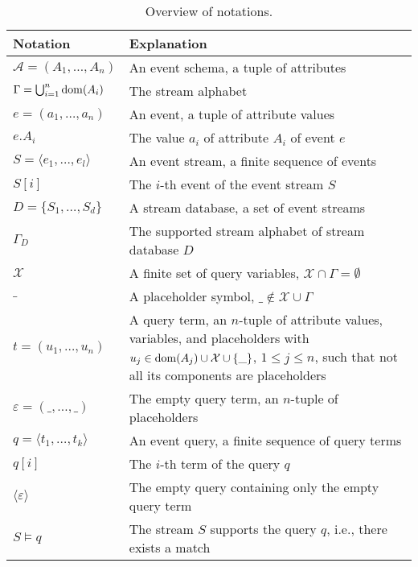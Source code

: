 \begin{table}[t]
	\caption{Overview of notations.}
	\label{tab:notations}
	\vspace{-1.1em}
	\footnotesize
	\begin{tabularx}{0.47\textwidth}{l
	@{\hspace{.5em}} p{5.8cm}}
	\toprule
	Notation & Explanation \\
	\midrule
	$\mathcal{A}=(A_1, \ldots, A_n )$ & An event
	schema, a
	tuple of attributes\\
	$\Gamma  = \bigcup_{i=1}^n{\operatorname{dom}(A_i)}$ & The stream alphabet\\
	$e= (a_1, \ldots, a_n)$ & An event, a tuple
	of attribute values\\
	$e.A_i$ & The value $a_i$ of attribute $A_i$ of
	event $e$\\
	$S=\langle e_1, \ldots, e_l \rangle$ & An event
	stream, a finite sequence of events\\
	$S[i]$ & The $i$-th event of the event stream $S$\\
	$D=\{S_1,\ldots, S_d \}$ & A stream database, a
	set of event streams\\
	$\Gamma_D$ & The supported stream alphabet of stream database $D$\\
	\midrule
	$\mathcal{X}$ & A finite set of query variables, $\mathcal{X} \cap
	\Gamma=\emptyset$\\
	$\_$ & A placeholder symbol, $\_ \notin \mathcal{X}\cup
	\Gamma$\\
	$t=(u_{1},\ldots,u_{n})$& A query term, an
	$n$-tuple of attribute values, variables, and placeholders with $u_{j}\in
	\operatorname{dom}(A_j) \cup \mathcal{X} \cup \{\_ \}$, $1\leq j\leq n$, such that not
	all its components are placeholders\\
	$\varepsilon=(\_,\ldots,\_)$& The empty query term, an
$n$-tuple of placeholders\\
	$q=\langle
	t_1, \ldots, t_k \rangle$ & An event query, a finite sequence of
	query terms \\
	$q[i]$ & The $i$-th term of the query $q$\\
	$\langle \varepsilon\rangle$ & The empty query containing only the empty
	query term \\
	\midrule
	$S \models q$ & The stream $S$ supports the
	query $q$, i.e., there exists a match\\
	\bottomrule
	\end{tabularx}
\end{table}
